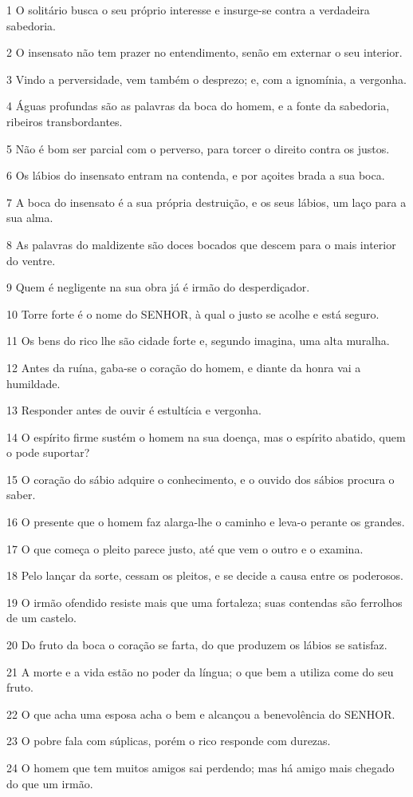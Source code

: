 \par 1 O solitário busca o seu próprio interesse e insurge-se contra a verdadeira sabedoria.
\par 2 O insensato não tem prazer no entendimento, senão em externar o seu interior.
\par 3 Vindo a perversidade, vem também o desprezo; e, com a ignomínia, a vergonha.
\par 4 Águas profundas são as palavras da boca do homem, e a fonte da sabedoria, ribeiros transbordantes.
\par 5 Não é bom ser parcial com o perverso, para torcer o direito contra os justos.
\par 6 Os lábios do insensato entram na contenda, e por açoites brada a sua boca.
\par 7 A boca do insensato é a sua própria destruição, e os seus lábios, um laço para a sua alma.
\par 8 As palavras do maldizente são doces bocados que descem para o mais interior do ventre.
\par 9 Quem é negligente na sua obra já é irmão do desperdiçador.
\par 10 Torre forte é o nome do SENHOR, à qual o justo se acolhe e está seguro.
\par 11 Os bens do rico lhe são cidade forte e, segundo imagina, uma alta muralha.
\par 12 Antes da ruína, gaba-se o coração do homem, e diante da honra vai a humildade.
\par 13 Responder antes de ouvir é estultícia e vergonha.
\par 14 O espírito firme sustém o homem na sua doença, mas o espírito abatido, quem o pode suportar?
\par 15 O coração do sábio adquire o conhecimento, e o ouvido dos sábios procura o saber.
\par 16 O presente que o homem faz alarga-lhe o caminho e leva-o perante os grandes.
\par 17 O que começa o pleito parece justo, até que vem o outro e o examina.
\par 18 Pelo lançar da sorte, cessam os pleitos, e se decide a causa entre os poderosos.
\par 19 O irmão ofendido resiste mais que uma fortaleza; suas contendas são ferrolhos de um castelo.
\par 20 Do fruto da boca o coração se farta, do que produzem os lábios se satisfaz.
\par 21 A morte e a vida estão no poder da língua; o que bem a utiliza come do seu fruto.
\par 22 O que acha uma esposa acha o bem e alcançou a benevolência do SENHOR.
\par 23 O pobre fala com súplicas, porém o rico responde com durezas.
\par 24 O homem que tem muitos amigos sai perdendo; mas há amigo mais chegado do que um irmão.

